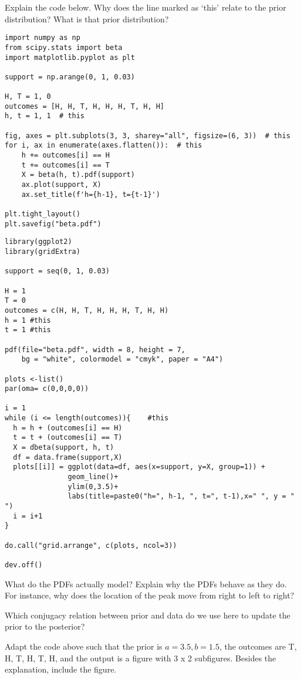 \begin{exercise}
Explain the code below. Why does the line marked as `this' relate to the  prior distribution? What is that prior distribution?
\begin{verbatim}
import numpy as np
from scipy.stats import beta
import matplotlib.pyplot as plt

support = np.arange(0, 1, 0.03)

H, T = 1, 0
outcomes = [H, H, T, H, H, H, T, H, H]
h, t = 1, 1  # this

fig, axes = plt.subplots(3, 3, sharey="all", figsize=(6, 3))  # this
for i, ax in enumerate(axes.flatten()):  # this
    h += outcomes[i] == H
    t += outcomes[i] == T
    X = beta(h, t).pdf(support)
    ax.plot(support, X)
    ax.set_title(f'h={h-1}, t={t-1}')

plt.tight_layout()
plt.savefig("beta.pdf")
\end{verbatim}

\begin{verbatim}
library(ggplot2)
library(gridExtra)

support = seq(0, 1, 0.03)

H = 1
T = 0
outcomes = c(H, H, T, H, H, H, T, H, H)
h = 1 #this
t = 1 #this

pdf(file="beta.pdf", width = 8, height = 7, 
	bg = "white", colormodel = "cmyk", paper = "A4")          
    
plots <-list()
par(oma= c(0,0,0,0))

i = 1
while (i <= length(outcomes)){    #this
  h = h + (outcomes[i] == H)
  t = t + (outcomes[i] == T)
  X = dbeta(support, h, t)
  df = data.frame(support,X)
  plots[[i]] = ggplot(data=df, aes(x=support, y=X, group=1)) +
               geom_line()+
               ylim(0,3.5)+  
               labs(title=paste0("h=", h-1, ", t=", t-1),x=" ", y = " ")
  i = i+1
}

do.call("grid.arrange", c(plots, ncol=3))

dev.off()
\end{verbatim}


\end{exercise}

\begin{exercise}
What do the PDFs actually model? Explain why the PDFs behave as they do. For instance, why does the location of the peak move from right to left to right?
\end{exercise}

\begin{exercise}
Which conjugacy relation between prior and data do we use here to update the prior to the posterior?
\end{exercise}

\begin{exercise}
Adapt the  code above such that the prior is $a=3.5, b= 1.5$, the outcomes are T, H, T, H, T, H, and the output is a figure with 3 x 2 subfigures. Besides the explanation, include the figure.
\begin{solution}
\end{solution}
\end{exercise}




